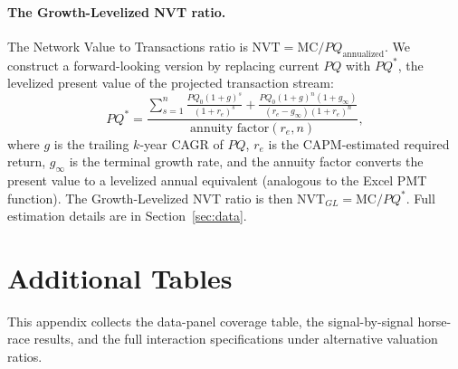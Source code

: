 \documentclass[12pt]{article}
\begin{document}
\paragraph{The Growth-Levelized NVT ratio.} The Network Value to Transactions ratio is
$\text{NVT} = \text{MC} / PQ_{\text{annualized}}$. We construct a forward-looking
version by replacing current $PQ$ with $PQ^*$, the levelized present value of the
projected transaction stream:
\[
PQ^* = \frac{\sum_{s=1}^{n} \frac{PQ_0 (1+g)^s}{(1+r_e)^s}
+ \frac{PQ_0(1+g)^n(1+g_{\infty})}{(r_e - g_{\infty})(1+r_e)^n}}
{\text{annuity factor}(r_e, n)},
\]
where $g$ is the trailing $k$-year CAGR of $PQ$, $r_e$ is the CAPM-estimated required
return, $g_{\infty}$ is the terminal growth rate, and the annuity factor converts the
present value to a levelized annual equivalent (analogous to the Excel PMT function).
The Growth-Levelized NVT ratio is then $\text{NVT}_{GL} = \text{MC} / PQ^*$. Full estimation
details are in Section~\ref{sec:data}.


% 


\FloatBarrier
\section{Additional Tables}
\label{app:tables}

This appendix collects the data-panel coverage table, the signal-by-signal horse-race results, and the full interaction specifications under alternative valuation ratios.
\end{document}
